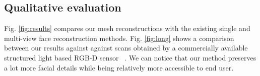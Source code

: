 \documentclass[10pt,twocolumn,letterpaper]{article}
\begin{document}


\subsection{Qualitative evaluation} \label{sec:qual}

Fig. \ref{fig:results} compares our mesh reconstructions with the existing single and multi-view face reconstruction methods.  
Fig. \ref{fig:long} shows a comparison between our results against against scans obtained by a commercially available structured light based RGB-D sensor ~\cite{structure2019}. We can notice that our method preserves a lot more facial details while being relatively more accessible to end user.




\end{document}
